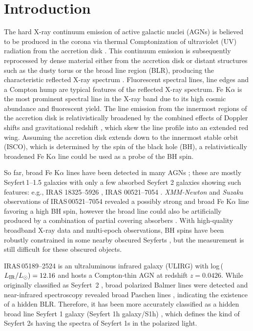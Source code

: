 \documentclass[]{emulateapj}
\def \xmm {{\em XMM-Newton }}
\def \suzaku {{\em Suzaku }}
\def \iras {{IRAS\,05189--2524 }}
\newcommand{\Lsun}      {\mbox{$L_{\mathord\odot}$}}
\begin{document}
\section{Introduction}
The hard X-ray continuum emission of active galactic nuclei (AGNs) is believed to be produced in the corona via thermal Comptonization of ultraviolet (UV) radiation from the accretion disk \citep[e.g.,][]{haa93}. This continuum emission is subsequently reprocessed by dense material either from the accretion disk or distant structures such as the dusty torus or the broad line region (BLR), producing the characteristic reflected X-ray spectrum \citep[e.g.,][]{geo91}. Fluorescent spectral lines, line edges and a Compton hump are typical features of the reflected X-ray spectrum. Fe K$\alpha$ is the most prominent spectral line in the X-ray band  due to its high cosmic abundance and fluorescent yield. The line emission from the innermost regions of the accretion disk is relativistically broadened by the combined effects of Doppler shifts and gravitational redshift \citep{fab89, lao91}, which skew the line profile into an extended red wing. Assuming the accretion disk extends down to the innermost stable orbit (ISCO), which is determined by the spin of the black hole (BH), a relativistically broadened Fe K$\alpha$ line could be used as a probe of the BH spin.

So far, broad Fe K$\alpha$ lines have been detected in many AGNs \citep[e.g.][]{tan95, nan07, ris13, wal13}; these are mostly Seyfert\,1--1.5 galaxies with only a few absorbed Seyfert 2 galaxies showing such features: e.g., IRAS 18325--5926 \citep{iwa96}, IRAS 00521--7054 \citep{tan12}. \xmm and \suzaku observations of IRAS\,00521--7054 revealed a possibly strong and broad Fe K$\alpha$ line favoring a high BH spin, however the broad line could also be artificially produced by a combination of partial covering absorbers \citep{tan12, ric14}. With high-quality broadband X-ray data and multi-epoch observations, BH spins have been robustly constrained in some nearby obscured Seyferts \citep[e.g., Seyfert 1.9 galaxy NGC 1365,][]{ris13, wal14}, but the measurement is still difficult for these obscured objects.

\iras is an ultraluminous infrared galaxy (ULIRG) with log\,($L_{\rm IR}/\Lsun)=12.16$ \citep{u12} and hosts a Compton-thin AGN at redshift $z=0.0426$. While originally classified as Seyfert~2 \citep{vei95}, broad polarized Balmer lines were detected \citep{you96} and near-infrared spectroscopy revealed broad Paschen lines \citep{vei99b, sev01}, indicating the existence of a hidden BLR. Therefore, it has been more accurately classified as a hidden broad line Seyfert 1 galaxy (Seyfert 1h galaxy/S1h) \citep{ver06}, which defines the kind of Seyfert 2s having the spectra of Seyfert 1s in the polarized light. 
\end{document}
